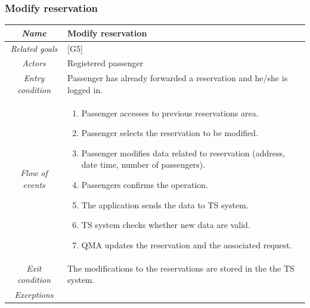 \clearpage{}


\subsubsection{Modify reservation}

\begin{flushleft}
\begin{tabular}{c|>{\raggedright}p{10cm}}
\hline 
\emph{Name } & \raggedright{}Modify reservation\tabularnewline
\hline 
\emph{Related goals} & \raggedright{}{[}G5{]}\tabularnewline
\hline 
\emph{Actors} & \raggedright{}Registered passenger\tabularnewline
\hline 
\emph{Entry condition} & \raggedright{}Passenger has already forwarded a reservation and he/she
is logged in.\tabularnewline
\hline 
\emph{Flow of events} & \begin{enumerate}
\item \begin{raggedright}
Passenger accesses to previous reservations area.
\par\end{raggedright}
\item \begin{raggedright}
Passenger selects the reservation to be modified.
\par\end{raggedright}
\item \begin{raggedright}
Passenger modifies data related to reservation (address, date time,
number of passengers).
\par\end{raggedright}
\item \begin{raggedright}
Passengers confirms the operation.
\par\end{raggedright}
\item The application sends the data to TS system.
\item \begin{raggedright}
TS system checks whether new data are valid.
\par\end{raggedright}
\item \raggedright{}QMA updates the reservation and the associated request.\end{enumerate}
\tabularnewline
\hline 
\emph{Exit condition} & \raggedright{}The modifications to the reservations are stored in
the the TS system.\tabularnewline
\hline 
\emph{Exceptions} & \begin{itemize}

\end{itemize}
\end{tabular}
\end{flushleft}
